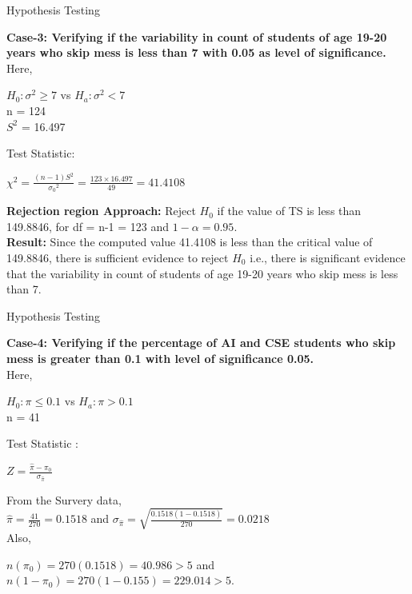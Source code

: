 \documentclass{beamer}
\begin{document}
\begin{frame}{Hypothesis Testing}
\begin{block}{}
\textbf{Case-3: Verifying if the variability in count of students of age 19-20 years who skip mess is less than 7 with 0.05 as level of significance.}\\
Here, 
\begin{center}
$H_0 : \sigma^2 \geq 7$ vs $H_a : \sigma^2 < 7$\\
n = 124\\
$S^2$ = 16.497
\end{center}
Test Statistic:
\begin{center}
$\chi^2 = \frac{(n-1){S^2}}{{\sigma_0}^2} = \frac{123\times16.497}{49} = 41.4108$
\end{center}
\textbf{Rejection region Approach:} 
Reject $H_0$ if the value of TS is less than 149.8846, for df = n-1 = 123 and $1 - \alpha = 0.95$.\\
\textbf{Result:}
Since the computed value 41.4108 is less than the critical value of 149.8846, there is sufficient evidence to reject $H_0$ i.e., there is significant evidence that the variability in count of students of age 19-20 years who skip mess is less than 7.
\end{block}
\end{frame}

\begin{frame}{Hypothesis Testing}
\begin{block}{}
\textbf{Case-4: Verifying if the percentage of AI and CSE students who skip mess is greater than 0.1 with level of significance 0.05.}\\
Here,
\begin{center}
$H_0 : \pi \leq 0.1$ vs $H_a : \pi > 0.1$\\
n = 41
\end{center}
Test Statistic :
\begin{center}
$Z = \frac{\hat{\pi}-{\pi_0}}{\sigma_{\hat{\pi}}}$
\end{center}
From the Survery data,\\
$\hat{\pi} = \frac{41}{270} = 0.1518$ and $\sigma_{\hat{\pi}} = \sqrt{\frac{0.1518(1-0.1518)}{270}} = 0.0218$\\
Also, 
\begin{center}
$n(\pi_0) = 270(0.1518) = 40.986 > 5$ and $n(1-\pi_0) = 270(1-0.155) = 229.014 > 5.$
\end{center}
\end{block}
\end{frame}
\end{document}

